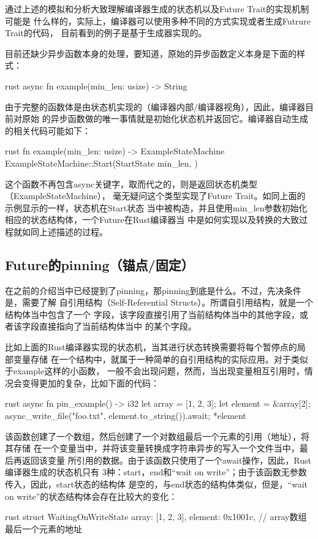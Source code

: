 通过上述的模拟和分析大致理解编译器生成的状态机以及Future Trait的实现机制可能是
什么样的，实际上，编译器可以使用多种不同的方式实现或者生成Futrure Trait的代码，
目前看到的例子是基于生成器实现的。

目前还缺少异步函数本身的处理，要知道，原始的异步函数定义本身是下面的样式：
\begin{code-block}{rust}
async fn example(min_len: usize) -> String
\end{code-block}
由于完整的函数体是由状态机实现的（编译器内部/编译器视角），因此，编译器目前对原始
的异步函数做的唯一事情就是初始化状态机并返回它。编译器自动生成的相关代码可能如下：
\begin{code-block}{rust}
fn example(min_len: usize) -> ExampleStateMachine {
    ExampleStateMachine::Start(StartState {
        min_len,
    })
}
\end{code-block}
这个函数不再包含async关键字，取而代之的，则是返回状态机类型（ExampleStateMachine），
毫无疑问这个类型实现了Future Trait。如同上面的示例显示的一样，状态机在Start状态
当中被构造，并且使用min\_len参数初始化相应的状态结构体，一个Future在Rust编译器当
中是如何实现以及转换的大致过程就如同上述描述的过程。

\subsection{Future的pinning（锚点/固定）}
在之前的介绍当中已经提到了pinning，那pinning到底是什么。不过，先决条件是，需要了解
自引用结构（Self-Referential Structs）。所谓自引用结构，就是一个结构体当中包含了一个
字段，该字段直接引用了当前结构体当中的其他字段，或者该字段直接指向了当前结构体当中
的某个字段。

比如上面的Rust编译器实现的状态机，当其进行状态转换需要将每个暂停点的局部变量存储
在一个结构中，就属于一种简单的自引用结构的实际应用。对于类似于example这样的小函数，
一般不会出现问题，然而，当出现变量相互引用时，情况会变得更加的复杂，比如下面的代码：
\begin{code-block}{rust}
async fn pin_example() -> i32 {
    let array = [1, 2, 3];
    let element = &array[2];
    async_write_file("foo.txt", element.to_string()).await;
    *element
}
\end{code-block}

该函数创建了一个数组，然后创建了一个对数组最后一个元素的引用（地址），将其存储
在一个变量当中，并将该变量转换成字符串异步的写入一个文件当中，最后再返回该变量
所引用的数据。由于该函数只使用了一个await操作，因此，Rust编译器生成的状态机只有
3种：start，end和“wait on write”；由于该函数无参数传入，因此，start状态的结构体
是空的，与end状态的结构体类似，但是，“wait on write”的状态结构体会存在比较大的变化：
\begin{code-block}{rust}
struct WaitingOnWriteState {
    array: [1, 2, 3],
    element: 0x1001c, // array数组最后一个元素的地址
}
\end{code-block}





